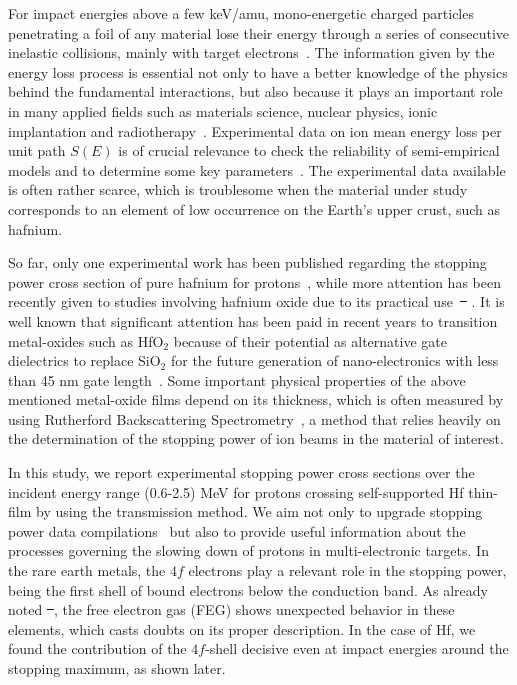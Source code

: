 \documentclass[aps,pra,reprint,groupedaddress,showpacs,showkeys]{revtex4-1} %
\providecommand{\DIFadd}[1]{{\protect\color{blue}\uwave{#1}}} %
\providecommand{\DIFdel}[1]{{\protect\color{red}\sout{#1}}}                      %
\providecommand{\DIFaddbegin}{} %
\providecommand{\DIFaddend}{} %
\providecommand{\DIFdelbegin}{} %
\providecommand{\DIFdelend}{} %
\newcommand{\DIFscaledelfig}{0.5}
\newlength{\DIFdelgraphicswidth} %
\newlength{\DIFdelgraphicsheight} %
\newcommand{\DIFaddincludegraphics}[2][]{{\color{blue}\fbox{\DIFOincludegraphics[#1]{#2}}}} %
\newcommand{\DIFdelincludegraphics}[2][]{%
\sbox{\DIFdelgraphicsbox}{\DIFOincludegraphics[#1]{#2}}%
\settoboxwidth{\DIFdelgraphicswidth}{\DIFdelgraphicsbox} %
\settoboxtotalheight{\DIFdelgraphicsheight}{\DIFdelgraphicsbox} %
\scalebox{\DIFscaledelfig}{%
\parbox[b]{\DIFdelgraphicswidth}{\usebox{\DIFdelgraphicsbox}\\[-\baselineskip] \rule{\DIFdelgraphicswidth}{0em}}\llap{\resizebox{\DIFdelgraphicswidth}{\DIFdelgraphicsheight}{%
\setlength{\unitlength}{\DIFdelgraphicswidth}%
\begin{picture}(1,1)%
\thicklines\linethickness{2pt} %
{\color[rgb]{1,0,0}\put(0,0){\framebox(1,1){}}}%
{\color[rgb]{1,0,0}\put(0,0){\line( 1,1){1}}}%
{\color[rgb]{1,0,0}\put(0,1){\line(1,-1){1}}}%
\end{picture}%
}\hspace*{3pt}}} %
} %
\DeclareRobustCommand{\DIFaddbegin}{\DIFOaddbegin \let\includegraphics\DIFaddincludegraphics} %
\DeclareRobustCommand{\DIFaddend}{\DIFOaddend \let\includegraphics\DIFOincludegraphics} %
\DeclareRobustCommand{\DIFdelbegin}{\DIFOdelbegin \let\includegraphics\DIFdelincludegraphics} %
\DeclareRobustCommand{\DIFdelend}{\DIFOaddend \let\includegraphics\DIFOincludegraphics} %
\begin{document}
For impact energies above a few keV/amu, mono-energetic charged 
particles penetrating a foil of any material lose their energy through 
a series of consecutive inelastic collisions, mainly with target 
electrons~\cite{Chu01,Sigmund}. The information given by the energy 
loss process is essential not only to have a better knowledge of the 
physics behind the fundamental interactions, but also because it plays 
an important role in many applied fields such as materials science, 
nuclear physics, ionic implantation and radiotherapy~\cite{Sigmund,Schardt}. 
Experimental data on ion mean energy loss per unit path $S(E)$ is of 
crucial relevance to check the reliability of semi-empirical models and 
to determine some key parameters~\cite{Diwan,Damache04,Damache02}. The 
experimental data available is often rather scarce, which is troublesome 
when the material under study corresponds to an element of low 
occurrence on the Earth's upper crust, such as hafnium.

So far, only one experimental work has been published regarding the 
stopping power cross section of pure hafnium for protons~\cite{Sirotinin}, 
while more attention has been recently given to studies involving 
hafnium oxide due to its practical use~\DIFdelbegin \DIFdel{\mbox{%
\cite{Abril,Behar,Primetzhofer}}\hspace{0pt}%
}\DIFdelend \DIFaddbegin \DIFadd{\mbox{%
\cite{Abril,Behar,Primetzhofer,Roth}}\hspace{0pt}%
}\DIFaddend . 
It is well known that significant attention has been paid in recent 
years to transition metal-oxides such as HfO$_2$ because of their 
potential as alternative gate dielectrics to replace SiO$_2$ for the 
future generation of nano-electronics with less than 45 nm gate 
length~\cite{Choi,Robertson}. Some important physical properties of the 
above mentioned metal-oxide films depend on its thickness, which is 
often measured by using Rutherford Backscattering Spectrometry~\cite{Alfassi01,Tesmer01}, 
a method that relies heavily on the determination of the stopping power 
of ion beams in the material of interest.

In this study, we report experimental stopping power cross sections 
over the incident energy range (0.6-2.5) MeV for protons crossing 
self-supported Hf thin-film by using the transmission method. We aim 
not only to upgrade stopping power data compilations~\cite{HPaul03,mondim17} 
but also to provide useful information about the processes governing 
the slowing down of protons in multi-electronic targets. In the rare 
earth metals, the $4f$ electrons play a relevant role in the stopping 
power, being the first shell of bound electrons below the conduction 
band. As already noted \DIFdelbegin \DIFdel{~}\DIFdelend \cite{Roth17}, the free electron gas (FEG) shows 
unexpected %
behavior in these elements, which casts %
doubts on its proper 
description. In the case of Hf, we found the contribution of the 
$4f$-shell decisive even at impact energies around the stopping maximum, 
as shown later.
\end{document}
